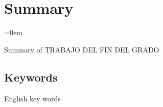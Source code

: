 \newpage
\chapter*{Summary}
\parindent=0em

Summary of TRABAJO DEL FIN DEL GRADO 





\section*{Keywords}

English key words


